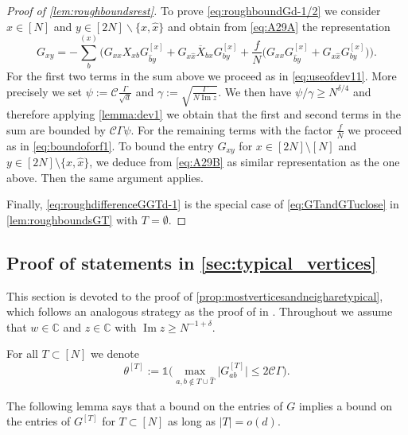 \documentclass[10pt,a4paper]{amsart}
\DeclareMathOperator{\Ima}{Im}
\newcommand{\abs}[1]{\left| #1 \right|}
\newcommand{\absn}[1]{\bigl| #1 \bigr|} %
\newcommand{\C}{\mathbb{C}}
\renewcommand{\Im}{\Ima}
\numberwithin{equation}{section}
\newcommand*\barr[1]{\overline{#1}}
\newcommand*\bset[1]{[#1]}
\newcommand*\ubarr[1]{{\widehat{#1}}}
\begin{document}
\begin{proof}[Proof of \cref{lem:roughboundsrest}]
		To prove \cref{eq:roughboundGd-1/2} we consider $x\in [N]$ and $y \in [2N] \backslash \{x,\ubarr{x} \}$ and obtain from \cref{eq:A29A} the representation  
		\begin{equation*}
			G_{xy} = - \sum_{b}^{(x)} \bigg( G_{xx} {X}_{xb}G_{\ubarr{b}y}^{\bset{x}} + G_{x\ubarr{x}} \barr{X}_{bx}G_{by}^{\bset{x}} + \frac{f}{N} \bigg( G_{xx} G_{\ubarr{b}y}^{\bset{x}} + G_{x\ubarr{x}} G_{by}^{\bset{x}}\bigg) \bigg).
		\end{equation*}
		For the first two terms in the sum above we proceed as in \cref{eq:useofdev11}.  More precisely we set $\psi := \mathcal C \frac{\Gamma}{\sqrt{d}}$ and $\gamma:= \sqrt{\frac{\Gamma}{N \Ima z}}$. We then have $\psi/\gamma \ge N^{\delta/4}$  and therefore applying 
		\cref{lemma:dev1} we obtain that the first and second terms in the sum are bounded by $\mathcal C \Gamma \psi $. For the remaining terms with the factor $\frac{f}{N}$  we proceed as in \cref{eq:boundoforf1}. To bound the entry $G_{xy}$ for $x \in [2N] \setminus [N]$ and $y \in [2N] \setminus \{x,\ubarr{x}\}$, we deduce from \cref{eq:A29B} as 
		similar representation as the one above. Then the same argument applies. 
		
		Finally, \cref{eq:roughdifferenceGGTd-1} is the special case of \cref{eq:GTandGTuclose} in   \cref{lem:roughboundsGT} with $T= \emptyset$.
	\end{proof}
	\subsection{Proof of statements in \cref{sec:typical_vertices}}\label{subsection:proofs_typical_vert}
		This section is devoted to the proof of \cref{prop:mostverticesandneigharetypical}, which follows an analogous  strategy as the proof of \cite[Proposition~4.8]{alt2021delocalization} in   \cite[Section~4.2]{alt2021delocalization}.  
		Throughout we assume that $w \in \C$ and $z \in \C$ with $\Im z \geq N^{-1 + \delta}$. 
	
 For all $T \subset [N]$ we denote
	\begin{equation}\label{thetaT}
		\theta^{[T]} :=\mathds{1} \bigg( \max_{a,b \notin T\cup \ubarr{T}} \absn{G^{\bset{T}}_{ab}} \le 2 \mathcal C \Gamma \bigg).
	\end{equation}

	The following lemma says that a bound on the entries of $G$ implies a bound on the entries of $G^{\bset{T}}$ for $T \subset [N]$ as long as $\abs{T} = o(d)$.
\end{document}
